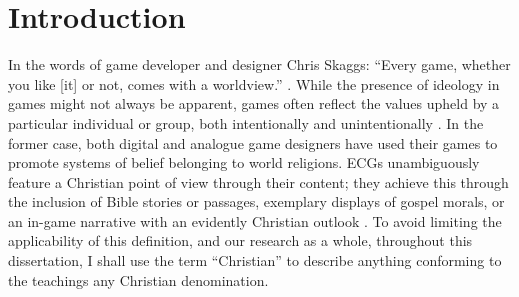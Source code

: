 \chapter{Introduction}



In the words of game developer and designer Chris Skaggs: ``Every game, whether you like [it] or not, comes with a worldview.'' \parencite[136]{schut_making_2013}.  While the presence of ideology in games might not always be apparent, games often reflect the values upheld by a particular individual or group, both intentionally and unintentionally \parencite{bogost_persuasive_2007, flanagan_values_2014}. In the former case, both digital and analogue game designers have used their games to promote systems of belief belonging to world religions. \acp{ECG} unambiguously feature a Christian point of view through their content; they achieve this through the inclusion of Bible stories or passages, exemplary displays of gospel morals, or an in-game narrative with an evidently Christian outlook \parencite[137]{schut_making_2013}. To avoid limiting the applicability of this definition, and our research as a whole, throughout this dissertation, I shall use the term ``Christian'' to describe anything conforming to the teachings any Christian denomination.%


